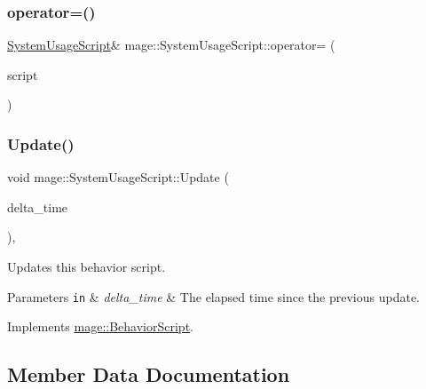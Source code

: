 \subsubsection{\texorpdfstring{operator=()}{operator=()}\hspace{0.1cm}{\footnotesize\ttfamily [2/2]}}
{\footnotesize\ttfamily \hyperlink{classmage_1_1_system_usage_script}{System\+Usage\+Script}\& mage\+::\+System\+Usage\+Script\+::operator= (\begin{DoxyParamCaption}\item[{\hyperlink{classmage_1_1_system_usage_script}{System\+Usage\+Script} \&\&}]{script }\end{DoxyParamCaption})\hspace{0.3cm}{\ttfamily [delete]}}

\hypertarget{classmage_1_1_system_usage_script_af7189c6e81dabfe077710ed9f3c7cd09}{}\label{classmage_1_1_system_usage_script_af7189c6e81dabfe077710ed9f3c7cd09} 
\subsubsection{\texorpdfstring{Update()}{Update()}}
{\footnotesize\ttfamily void mage\+::\+System\+Usage\+Script\+::\+Update (\begin{DoxyParamCaption}\item[{double}]{delta\+\_\+time }\end{DoxyParamCaption})\hspace{0.3cm}{\ttfamily [override]}, {\ttfamily [virtual]}}

Updates this behavior script.


\begin{DoxyParams}[1]{Parameters}
\mbox{\tt in}  & {\em delta\+\_\+time} & The elapsed time since the previous update. \\
\hline
\end{DoxyParams}


Implements \hyperlink{classmage_1_1_behavior_script_a905b6c83640cb91d19fecab3435f6feb}{mage\+::\+Behavior\+Script}.



\subsection{Member Data Documentation}
\hypertarget{classmage_1_1_system_usage_script_ab8df9ff99617df9010c4c2f27a6ff9c8}{}\label{classmage_1_1_system_usage_script_ab8df9ff99617df9010c4c2f27a6ff9c8} 
